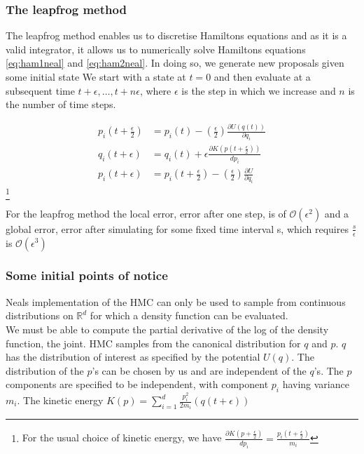 \documentclass[twoside]{article}
\begin{document}
\subsubsection{The leapfrog method}
The leapfrog method enables us to discretise Hamiltons equations and as it is a valid integrator, it allows us to numerically solve Hamiltons equations \ref{eq:ham1neal} and \ref{eq:ham2neal}. In doing so, we generate new proposals given some initial state 
We start with a state at $t = 0$ and then evaluate at a subsequent time $t + \epsilon , \hdots, t + n\epsilon$, where $\epsilon$ is the step in which we increase and $n$ is the number of time steps. 

\begin{align}
p_{i}(t + \frac{\epsilon}{2}) &= p_{i}(t) - \left(\frac{\epsilon}{2}\right)\frac{\partial U(q(t))}{\partial q_{i}} \\
q_{i}(t + \epsilon) &= q_{i}(t) + \epsilon\frac{\partial K(p(t + \frac{\epsilon}{2}))}{dp_{i}}\\
p_{i}(t + \epsilon) &= p_{i}(t + \frac{\epsilon}{2}) - \left(\frac{\epsilon}{2}\right)\frac{\partial U}{\partial q_{i}}
\end{align}
\footnote{For the usual choice of kinetic energy, we have $\frac{\partial K(p + \frac{\epsilon}{2})}{dp_{i}} = \frac{p_{i}(t + \frac{\epsilon}{2})}{m_{i}}$}

For the leapfrog method the local error, error after one step, is of $\mathcal{O}(\epsilon^{2})$ and a global error, error after simulating for some fixed time interval s, which requires $\frac{s}{\epsilon}$ is $\mathcal{O}(\epsilon^{3})$
\subsubsection{Some initial points of notice}
Neals implementation of the HMC can only be used to sample from continuous distributions on $\mathbb{R}^{d}$ for which a density function can be evaluated.\\
We must be able to compute the partial derivative of the log of the density function, the joint. 
HMC samples from the canonical distribution for $q$ and $p$. $q$ has the distribution of interest as specified by the potential $U(q)$. 
The distribution of the $p$'s can be chosen by us and are independent of the $q$'s. 
The $p$ components are specified to be independent, with component $p_{i}$ having variance $m_{i}$.
The kinetic energy $K(p) = \sum_{i =1}^{d}\frac{p_{i}^{2}}{2m_{i}}(q(t + \epsilon))
$
\end{document}
